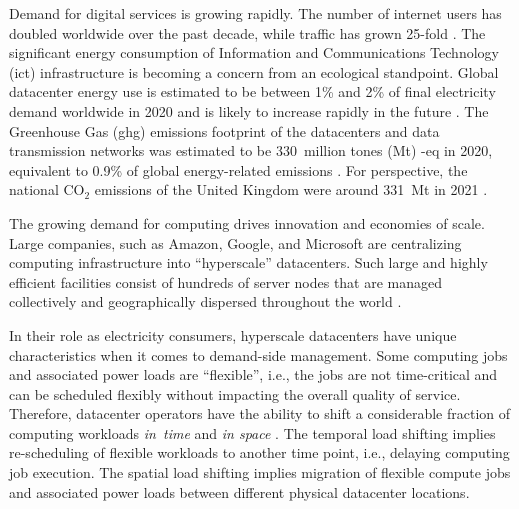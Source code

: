 %



Demand for digital services is growing rapidly. The number of internet users has doubled worldwide over the past decade, while traffic has grown 25-fold \cite{ieaDataCentresData2023}.
The significant energy consumption of Information and Communications Technology (\gls{ict}) infrastructure is becoming a concern from an ecological standpoint.
Global datacenter energy use is estimated to be between 1\% and 2\% of final electricity demand worldwide in 2020 \cite{davidmyttonHowMuchEnergy2020, masanetRecalibratingGlobalData2020} and is likely to increase rapidly in the future \cite{andraeGlobalElectricityUsage2015}.
The Greenhouse Gas (\gls{ghg}) emissions footprint of the datacenters and data transmission networks was estimated to be 330~million tones (Mt) \co-eq in 2020, equivalent to 0.9\% of global energy-related emissions \cite{ieaDataCentresData2023, malmodinICTSectorElectricity2023}.
For perspective, the national CO$_2$ emissions of the United Kingdom were around 331~Mt in 2021 \cite{UKnationalstats}.


The growing demand for computing drives innovation and economies of scale. Large companies, such as Amazon, Google, and Microsoft are centralizing computing infrastructure into \enquote{hyperscale} datacenters.
Such large and highly efficient facilities consist of hundreds of server nodes that are managed collectively and geographically dispersed throughout the world \cite{ThereAre500}.

In their role as electricity consumers, hyperscale datacenters have unique characteristics when it comes to demand-side management.
Some computing jobs and associated power loads are \enquote{flexible}, i.e., the jobs are not time-critical and can be scheduled flexibly without impacting the overall quality of service.
Therefore, datacenter operators have the ability to shift a considerable fraction of computing workloads \textit{in~time} and \textit{in space} \cite{radovanovicIEEE2023}.
The temporal load shifting implies re-scheduling of flexible workloads to another time point, i.e., delaying computing job execution.
The spatial load shifting implies migration of flexible compute jobs and associated power loads between different physical datacenter locations.

